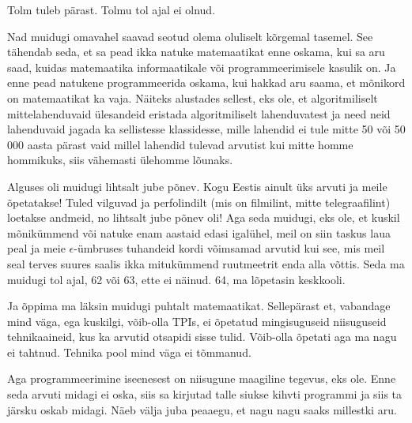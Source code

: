 Tolm tuleb pärast. Tolmu tol ajal ei olnud. 

Nad muidugi omavahel saavad seotud olema oluliselt kõrgemal tasemel. See tähendab seda, et sa pead ikka natuke matemaatikat enne oskama, kui sa aru saad, kuidas matemaatika informaatikale või programmeerimisele kasulik on. Ja enne pead natukene programmeerida oskama, kui hakkad aru saama, et mõnikord on matemaatikat ka vaja. Näiteks alustades sellest, eks ole, et algoritmiliselt mittelahenduvaid ülesandeid eristada algoritmiliselt lahenduvatest ja need neid lahenduvaid jagada ka sellistesse klassidesse, mille lahendid ei tule mitte 50 või 50 000 aasta pärast vaid millel lahendid tulevad arvutist kui mitte homme hommikuks, siis vähemasti ülehomme lõunaks.


Alguses oli muidugi lihtsalt jube põnev. Kogu Eestis ainult üks arvuti ja meile õpetatakse! Tuled vilguvad ja perfolindilt (mis on filmilint, mitte telegraafilint) loetakse andmeid,  no lihtsalt jube põnev oli! Aga seda muidugi, eks ole, et kuskil mõnikümmend või natuke enam aastaid edasi igalühel, meil on siin taskus laua peal ja meie $\epsilon$-ümbruses tuhandeid kordi võimsamad arvutid kui see, mis meil seal terves suures saalis ikka mitukümmend ruutmeetrit enda alla võttis. Seda ma muidugi tol ajal, 62 või 63, ette ei näinud. 64, ma lõpetasin keskkooli. 

Ja õppima ma läksin muidugi puhtalt matemaatikat. Sellepärast et, vabandage mind väga, ega kuskilgi, võib-olla TPIs, ei õpetatud mingisuguseid niisuguseid tehnikaaineid, kus ka arvutid otsapidi sisse tulid. Võib-olla õpetati aga ma nagu ei tahtnud. Tehnika pool mind väga ei tõmmanud. 

Aga programmeerimine iseenesest on niisugune maagiline tegevus, eks ole. Enne seda arvuti midagi ei oska, siis sa kirjutad talle siukse kihvti programmi ja siis ta järsku oskab midagi. Näeb välja juba peaaegu, et nagu nagu saaks millestki aru. 


